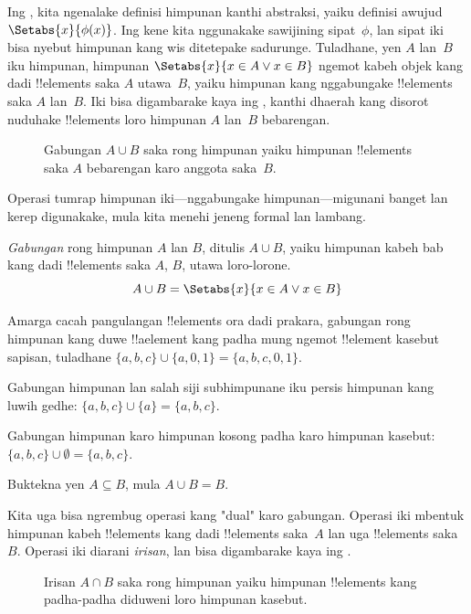 \documentclass[../../../include/open-logic-section]{subfiles}
\begin{document}

\begin{explain}
Ing , kita ngenalake definisi himpunan
kanthi abstraksi, yaiku definisi awujud $\Setabs{x}{\phi(x)}$.
Ing kene kita nggunakake sawijining sipat~$\phi$, lan sipat iki
bisa nyebut himpunan kang wis ditetepake sadurunge. Tuladhane,
yen $A$ lan~$B$ iku himpunan, himpunan
$\Setabs{x}{x \in A \lor x \in B}$ ngemot kabeh objek kang
dadi !!{element}s saka $A$ utawa~$B$, yaiku himpunan kang
nggabungake !!{element}s saka $A$ lan~$B$. Iki bisa digambarake
kaya ing , kanthi dhaerah kang disorot nuduhake
!!{element}s loro himpunan $A$ lan~$B$ bebarengan.

\begin{figure}
  \caption{Gabungan $A \cup B$ saka rong himpunan yaiku himpunan
   !!{element}s saka $A$ bebarengan karo anggota saka~$B$.}
\end{figure}

Operasi tumrap himpunan iki---nggabungake himpunan---migunani banget
lan kerep digunakake, mula kita menehi jeneng formal lan lambang.
\end{explain}

\begin{defn}[Gabungan]
\emph{Gabungan} rong himpunan $A$ lan $B$, ditulis $A \cup B$,
yaiku himpunan kabeh bab kang dadi !!{element}s saka $A$,
$B$, utawa loro-lorone.
\[
A \cup B = \Setabs{x}{x \in A \lor x \in B}
\]
\end{defn}

\begin{ex}
Amarga cacah pangulangan !!{element}s ora dadi prakara,
gabungan rong himpunan kang duwe !!a{element} kang padha
mung ngemot !!{element} kasebut sapisan, tuladhane
$\{ a, b, c\} \cup \{ a, 0, 1\} = \{a, b, c, 0, 1\}$.

Gabungan himpunan lan salah siji subhimpunane iku persis himpunan
kang luwih gedhe: $\{a,b, c \} \cup \{a \} = \{a, b, c\}$.

Gabungan himpunan karo himpunan kosong padha karo himpunan kasebut:
$\{a,b, c \} \cup \emptyset = \{a, b, c \}$.
\end{ex}

\begin{prob}
Buktekna yen $A \subseteq B$, mula $A \cup B = B$.
\end{prob}

\begin{explain}
Kita uga bisa ngrembug operasi kang "dual" karo gabungan.
Operasi iki mbentuk himpunan kabeh !!{element}s kang dadi
!!{element}s saka~$A$ lan uga !!{element}s saka~$B$.
Operasi iki diarani \emph{irisan}, lan bisa digambarake kaya
ing .
\begin{figure}
  \caption{Irisan $A \cap B$ saka rong himpunan yaiku himpunan
    !!{element}s kang padha-padha diduweni loro himpunan kasebut.}
\end{figure}
\end{explain}
\end{document}
